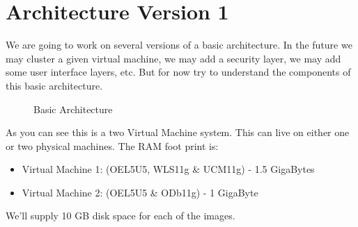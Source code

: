 \section{Architecture Version 1}

We are going to work on several versions of a basic architecture.  In
the future we may cluster a given virtual machine, we may add a
security layer, we may add some user interface layers, etc.  But for
now try to understand the components of this basic architecture.

\begin{figure}[h!]
  \centering
  \caption{Basic Architecture}
\end{figure}

As you can see this is a two Virtual Machine system.  This can live on
either one or two physical machines.  The RAM foot print is:
	
\begin{itemize}  
\item Virtual Machine 1: (OEL5U5, WLS11g \& UCM11g) - 1.5 GigaBytes
\item Virtual Machine 2: (OEL5U5 \& ODb11g) - 1 GigaByte
\end{itemize}
	
We'll supply 10 GB disk space for each of the images.